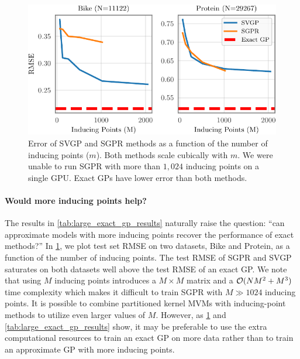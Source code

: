 \begin{figure}[!t]
  \centering
  \includegraphics[width=0.7\linewidth]{figures/inducing_points.pdf}
  \caption{
    Error of SVGP and SGPR methods as a function of the number of inducing points
    ($m$).  Both methods scale cubically with $m$.
    We were unable to run SGPR with more than $1,\!024$ inducing points on a single GPU.
    Exact GPs have lower error than both methods.
  }
  \label{fig:num_inducing_points}
\end{figure}

\paragraph{Would more inducing points help?}
The results in \cref{tab:large_exact_gp_results} naturally raise the question: ``can approximate models with more inducing points recover the performance of exact methods?''
In \cref{fig:num_inducing_points}, we plot test set RMSE on two datasets, Bike and Protein, as a function of the number of inducing points.
The test RMSE of SGPR and SVGP saturates on both datasets well above the test RMSE of an exact GP.
We note that using $M$ inducing points introduces a $M \times M$ matrix and a $\bigo{NM^2 + M^3}$ time complexity \cite{hensman2013gaussian,hensman2015scalable} which makes it difficult to train SGPR with $M \gg 1024$ inducing points.
It is possible to combine partitioned kernel MVMs with inducing-point methods to utilize even larger values of $M$.
However, as \cref{fig:num_inducing_points} and \cref{tab:large_exact_gp_results} show, it may be preferable to use the extra computational resources to train an exact GP on more data rather than to train an approximate GP with more inducing points.
